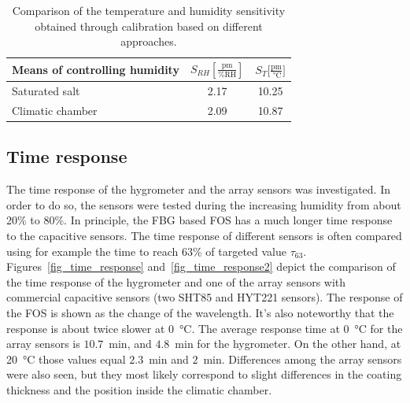 \begin{table}[!h]
\centering
\caption{Comparison of the temperature and humidity sensitivity obtained through calibration based on different approaches.}
\label{tab:fos}
\begin{tabular}{lcc}
Means of controlling humidity & $S_{RH} \mathrm{[\frac{pm}{\%RH}]}$ & $S_{T}\mathrm{[\frac{pm}{\SI{}{\celsius}}}]$  \\ \hline
Saturated salt                & 2.17     & 10.25   \\
Climatic chamber              & 2.09     & 10.87  
\end{tabular}%
\end{table}


\subsection{Time response}
The time response of the hygrometer and the array sensors was investigated. In order to do so, the sensors were tested during the increasing humidity from about 20\% to 80\%. In principle, the \gls{FBG} based \gls{FOS} has a much longer time response to the capacitive sensors. The time response of different sensors is often compared using for example the time to reach 63\% of targeted value $\tau_{63}$. Figures~\ref{fig_time_response} and~\ref{fig_time_response2} depict the comparison of the time response of the hygrometer and one of the array sensors with commercial capacitive sensors (two SHT85 and HYT221 sensors). The response of the \gls{FOS} is shown as the change of the wavelength. It's also noteworthy that the response is about twice slower at \SI{0}{\celsius}. The average response time at \SI{0}{\celsius} for the array sensors is $10.7$~min, and $4.8$~min for the hygrometer. On the other hand, at \SI{20}{\celsius} those values equal $2.3$~min and $2$~min. Differences among the array sensors were also seen, but they most likely correspond to slight differences in the coating thickness and the position inside the climatic chamber. 

